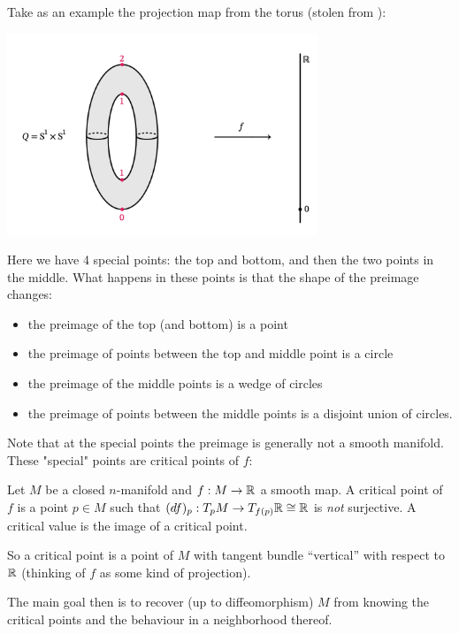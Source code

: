 Take as an example the projection map from the torus (stolen from \cite{HiroLee2022}):
\begin{center}
    \includegraphics[width=9.3cm]{images/Lecture on Morse Theory/TORUS MORSE THEORY.png}
\end{center}
 Here we have 4 special points: the top and bottom, and then the two points in the middle. What happens in these points is that the shape of the preimage changes:
\begin{itemize}
    \item the preimage of the top (and bottom) is a point
    \item the preimage of points between the top and middle point is a circle
    \item the preimage of the middle points is a wedge of circles
    \item the preimage of points between the middle points is a disjoint union of circles.
\end{itemize}
Note that at the special points the preimage is generally not a smooth manifold. These "special" points are critical points of $f$:

\begin{defn}
    Let $M$ be a closed $n$-manifold and $f:M\to\mathbb{R}$ a smooth map. A critical point of $f$ is a point $p \in M$ such that $(df)_p: T_p M \to T_{f(p)} \mathbb{R} \cong \mathbb{R}$ is \textit{not} surjective. 
    A critical value is the image of a critical point.
\end{defn}

\noindent So a critical point is a point of $M$ with tangent bundle ``vertical'' with respect to $\mathbb{R}$ (thinking of $f$ as some kind of projection).

The main goal then is to recover (up to diffeomorphism) $M$ from knowing the critical points and the behaviour in a neighborhood thereof. 


